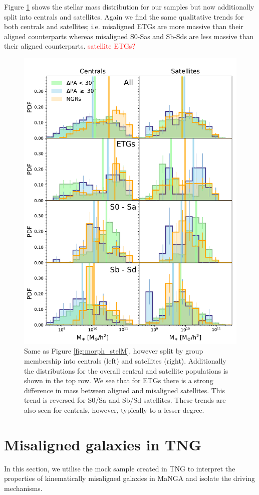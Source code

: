 \documentclass[fleqn,usenatbib]{mnras}
\newcommand{\red}[1]{{\textcolor{red}{#1}}}
\begin{document}
Figure \ref{fig:group_morph_stelM} shows the stellar mass distribution for our samples but now additionally split into centrals and satellites. Again we find the same qualitative trends for both centrals and satellites; i.e. misaligned ETGs are more massive than their aligned counterparts whereas misaligned S0-Sas and Sb-Sds are less massive than their aligned counterparts. \red{satellite ETGs?}
\begin{figure}
	\includegraphics[width=0.75\linewidth]{cen_sat/delPA_stelM_morph_lim_nsa.pdf}
    \caption{Same as Figure \ref{fig:morph_stelM}, however split by group membership into centrals (left) and satellites (right). Additionally the distributions for the overall central and satellite populations is shown in the top row. We see that for ETGs there is a strong difference in mass between aligned and misaligned satellites. This trend is reversed for S0/Sa and Sb/Sd satellites. These trends are also seen for centrals, however, typically to a lesser degree.}
    \label{fig:group_morph_stelM}
\end{figure}

\section{Misaligned galaxies in TNG} \label{sec:tng_results}
In this section, we utilise the mock sample created in TNG to interpret the properties of kinematically misaligned galaxies in MaNGA and isolate the driving mechanisms. 
\end{document}
